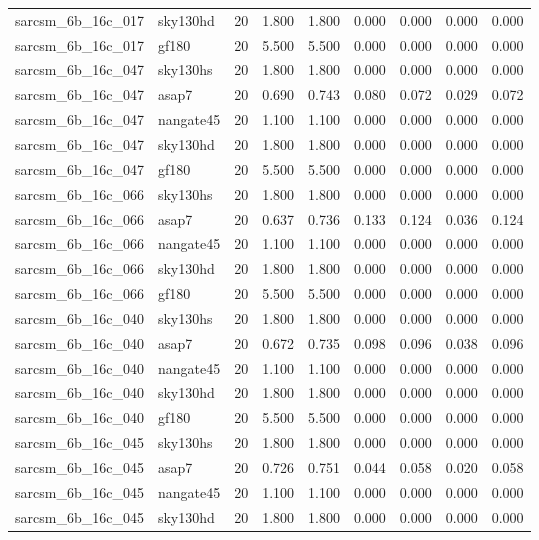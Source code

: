 \begin{tabular}{llrrrrrrr}
sarcsm\_6b\_16c\_017 & sky130hd & 20 & 1.800 & 1.800 & 0.000 & 0.000 & 0.000 & 0.000 \\
sarcsm\_6b\_16c\_017 & gf180 & 20 & 5.500 & 5.500 & 0.000 & 0.000 & 0.000 & 0.000 \\
sarcsm\_6b\_16c\_047 & sky130hs & 20 & 1.800 & 1.800 & 0.000 & 0.000 & 0.000 & 0.000 \\
sarcsm\_6b\_16c\_047 & asap7 & 20 & 0.690 & 0.743 & 0.080 & 0.072 & 0.029 & 0.072 \\
sarcsm\_6b\_16c\_047 & nangate45 & 20 & 1.100 & 1.100 & 0.000 & 0.000 & 0.000 & 0.000 \\
sarcsm\_6b\_16c\_047 & sky130hd & 20 & 1.800 & 1.800 & 0.000 & 0.000 & 0.000 & 0.000 \\
sarcsm\_6b\_16c\_047 & gf180 & 20 & 5.500 & 5.500 & 0.000 & 0.000 & 0.000 & 0.000 \\
sarcsm\_6b\_16c\_066 & sky130hs & 20 & 1.800 & 1.800 & 0.000 & 0.000 & 0.000 & 0.000 \\
sarcsm\_6b\_16c\_066 & asap7 & 20 & 0.637 & 0.736 & 0.133 & 0.124 & 0.036 & 0.124 \\
sarcsm\_6b\_16c\_066 & nangate45 & 20 & 1.100 & 1.100 & 0.000 & 0.000 & 0.000 & 0.000 \\
sarcsm\_6b\_16c\_066 & sky130hd & 20 & 1.800 & 1.800 & 0.000 & 0.000 & 0.000 & 0.000 \\
sarcsm\_6b\_16c\_066 & gf180 & 20 & 5.500 & 5.500 & 0.000 & 0.000 & 0.000 & 0.000 \\
sarcsm\_6b\_16c\_040 & sky130hs & 20 & 1.800 & 1.800 & 0.000 & 0.000 & 0.000 & 0.000 \\
sarcsm\_6b\_16c\_040 & asap7 & 20 & 0.672 & 0.735 & 0.098 & 0.096 & 0.038 & 0.096 \\
sarcsm\_6b\_16c\_040 & nangate45 & 20 & 1.100 & 1.100 & 0.000 & 0.000 & 0.000 & 0.000 \\
sarcsm\_6b\_16c\_040 & sky130hd & 20 & 1.800 & 1.800 & 0.000 & 0.000 & 0.000 & 0.000 \\
sarcsm\_6b\_16c\_040 & gf180 & 20 & 5.500 & 5.500 & 0.000 & 0.000 & 0.000 & 0.000 \\
sarcsm\_6b\_16c\_045 & sky130hs & 20 & 1.800 & 1.800 & 0.000 & 0.000 & 0.000 & 0.000 \\
sarcsm\_6b\_16c\_045 & asap7 & 20 & 0.726 & 0.751 & 0.044 & 0.058 & 0.020 & 0.058 \\
sarcsm\_6b\_16c\_045 & nangate45 & 20 & 1.100 & 1.100 & 0.000 & 0.000 & 0.000 & 0.000 \\
sarcsm\_6b\_16c\_045 & sky130hd & 20 & 1.800 & 1.800 & 0.000 & 0.000 & 0.000 & 0.000 \\

\end{tabular}
